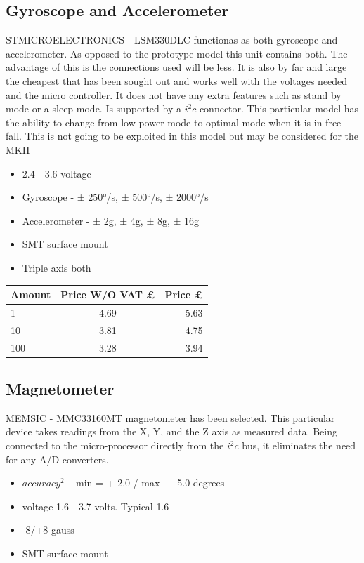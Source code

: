 \documentclass{report}
\begin{document}
\subsection{Gyroscope and Accelerometer}
STMICROELECTRONICS - LSM330DLC functionas as both gyroscope and accelerometer. As opposed to the prototype model this unit contains both. The advantage of this is the connections used will be less. It is also by far and large the cheapest that has been sought out and works well with the voltages needed and the micro controller. It does not have any extra features such as stand by mode or a sleep mode. Is supported by a $i^2c$ connector. This particular model has the ability to change from low power mode to optimal mode when it is in free fall. This is not going to be exploited in this model but may be considered for the MKII
\begin{itemize}
\item 2.4 - 3.6 voltage 
\item Gyroscope -  ± 250°/s, ± 500°/s, ± 2000°/s
\item Accelerometer - ± 2g, ± 4g, ± 8g, ± 16g
\item SMT surface mount 
\item Triple axis both
\end{itemize}

\begin{center}
  \begin{tabular}{ | l | c | r |}
    \hline
    Amount & Price W/O VAT £ & Price £ \\ \hline
    1 & 4.69 & 5.63 \\ \hline
    10 & 3.81 & 4.75 \\ \hline
    100 & 3.28& 3.94  \\ \hline
  \end{tabular}
\end{center}

\subsection{Magnetometer}
MEMSIC - MMC33160MT magnetometer has been selected. This particular device takes readings from the X, Y, and the Z axis as measured data. Being connected to the micro-processor directly from the $i^2c$ bus, it eliminates the need for any A/D converters. 

\begin{itemize}
\item $accuracy^2$ ~ min = +-2.0 / max +- 5.0 degrees 
\item voltage 1.6 - 3.7 volts. Typical 1.6
\item -8/+8 gauss
\item SMT surface mount 
\end{itemize}
\end{document}
